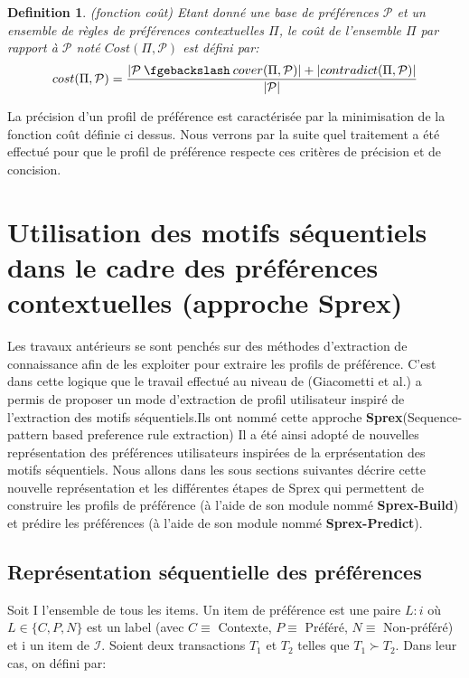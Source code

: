 \documentclass[a4paper,12pt,openany,oneside]{article}
\newcommand{\mysetminus}{\mathbin{\fgebackslash}}
\newtheorem{defn}{Definition} %
\begin{document}
\begin{defn}(fonction coût)
Etant donné une base de préférences $\mathcal{P}$ et un ensemble de règles de préférences contextuelles $\Pi$, le coût de l'ensemble $\Pi$ par rapport à $\mathcal{P}$ noté $Cost(\Pi,\mathcal{P})$ est défini par:
\[
cost(\Pi,\mathcal{P})=\frac{|\mathcal{P}\mysetminus cover(\Pi,\mathcal{P})|+|contradict(\Pi,\mathcal{P})|}{|\mathcal{P}|}
\]
\end{defn}
La précision d'un profil de préférence est caractérisée par la minimisation de la fonction coût définie ci dessus.
Nous verrons par la suite quel traitement a été effectué pour que le profil de préférence respecte ces critères de précision et de concision.

\section{Utilisation des motifs séquentiels dans le cadre des préférences contextuelles (approche Sprex)}

Les travaux antérieurs se sont penchés sur des méthodes d'extraction de connaissance afin de les exploiter pour extraire les profils de préférence.
C'est dans cette logique que le travail effectué au niveau de (Giacometti et al.) a permis de proposer un mode d'extraction de profil utilisateur inspiré de l'extraction des motifs séquentiels.Ils ont nommé cette approche \textbf{Sprex}(Sequence-pattern based preference rule extraction)
Il a été ainsi adopté de nouvelles représentation des préférences utilisateurs inspirées de la erprésentation des motifs séquentiels.
Nous allons dans les sous sections suivantes décrire cette nouvelle représentation et les différentes étapes de Sprex qui permettent de construire les profils de préférence (à l'aide de son module nommé \textbf{Sprex-Build}) et prédire les préférences (à l'aide de son module nommé \textbf{Sprex-Predict}). 

\subsection{Représentation séquentielle des préférences}
Soit I l'ensemble de tous les items. Un item de préférence est une paire $L:i$ où $L\in \{C,P,N\}$ est un label (avec $C\equiv $ Contexte, $P\equiv $ Préféré, $N\equiv $ Non-préféré) et i un item de $\mathcal{I}$.
Soient deux transactions $T_1$ et $T_2$ telles que $T_1\succ T_2$. Dans leur cas, on défini par:
\end{document}
